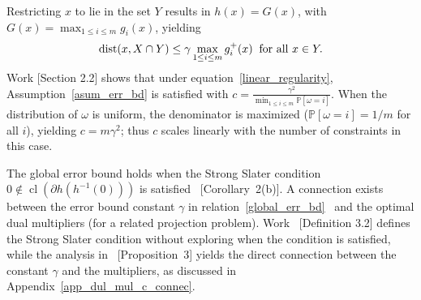 \documentclass{article}
\def\g{\gamma}
\def\dist{{\rm dist}}
\def\an#1{{\color{magenta} #1}}
\theoremstyle{plain}
\theoremstyle{definition}
\theoremstyle{remark}
\begin{document}
Restricting $x$ to lie in the set $Y$ results in  $h (x) = G(x)$, with $G(x) = \max_{1 \le i \le m} g_i(x)$, yielding
\begin{align}
    \dist(x, X \cap Y) \leq \gamma \max_{1\le i \le m} g_i^+(x) \;\; \text{for all } x \in Y . \label{linear_regularity}
\end{align}
Work \cite{nedic2011random} [Section 2.2] shows that under equation~\eqref{linear_regularity}, Assumption~\ref{asum_err_bd} is satisfied with $c = \frac{\gamma^2}{\min_{1\le i\le m} \mathbb{P}[\omega = i]}$.
When the distribution of $\omega$ is uniform, the denominator is maximized ($\mathbb{P}[\omega = i] = 1/m$ for all $i$), yielding $c = m \gamma^2$; thus $c$ scales linearly with the number of constraints in this case. %


The global error bound holds when the Strong Slater condition $0 \notin \operatorname{cl}(\partial h(h^{-1}(0)))$ is satisfied~\cite{lewis1998error} [Corollary~2(b)].
A connection exists between the error bound constant $\g$ in relation~\eqref{global_err_bd}~\cite{bertsekas1999note,
mangasarian1998error} and
the optimal dual multipliers (for a related projection problem). Work~\cite{mangasarian1998error} [Definition 3.2] defines the Strong Slater condition without exploring when the condition is satisfied, while the analysis in~\cite{bertsekas1999note} [Proposition~3] yields the direct connection between the constant $\g$ and the multipliers, as discussed in Appendix~\ref{app_dul_mul_c_connec}.
\end{document}
